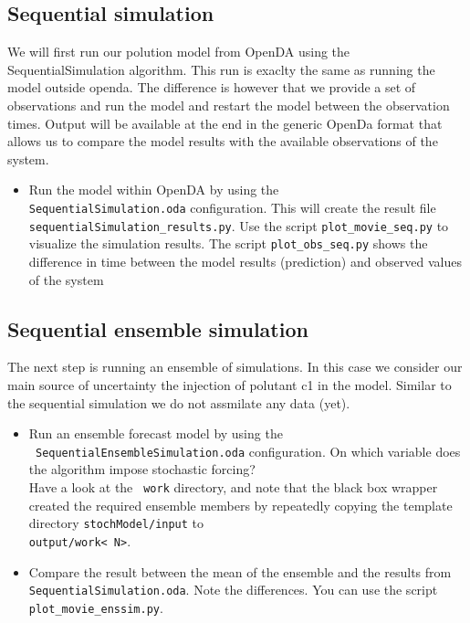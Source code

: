 
\subsection{Sequential simulation}
We will first run our polution model from OpenDA using the SequentialSimulation algorithm. This run is exaclty the same as running the model outside openda. The difference is however that we provide a set of observations and run the model and restart the model between the observation times. Output will be available at the end in the generic OpenDa format that allows us to compare the model results with the available observations of the system.

\begin{itemize}
\item Run the model within OpenDA by using
	 the \\{\tt SequentialSimulation.oda} configuration. This will create the result file 
		{\tt sequentialSimulation\_results.py}. Use the script  {\tt plot\_movie\_seq.py} to visualize
		the simulation results. The script {\tt plot\_obs\_seq.py} shows the difference in time between
		the model results (prediction) and observed values of the system
\end{itemize}

\subsection{Sequential ensemble simulation}
The next step is running an ensemble of simulations. In this case we consider our main source of uncertainty the injection of polutant c1 in the model. Similar to the sequential simulation we do not assmilate any data (yet).

\begin{itemize}
 \item Run an ensemble forecast model by using the \\{\tt
   SequentialEnsembleSimulation.oda} configuration. On which variable does the
   algorithm impose stochastic forcing?\\ Have a look at the {\tt
     work} directory, and note that the black box wrapper created
   the required ensemble members by repeatedly copying the template directory
   {\tt stochModel/input} to\\ {\tt output/work\textless
     N\textgreater}.
 \item Compare the result between the mean of the ensemble and the results from {\tt
     SequentialSimulation.oda}. Note the differences. 
     You can use the script {\tt plot\_movie\_enssim.py}.
\end{itemize}


